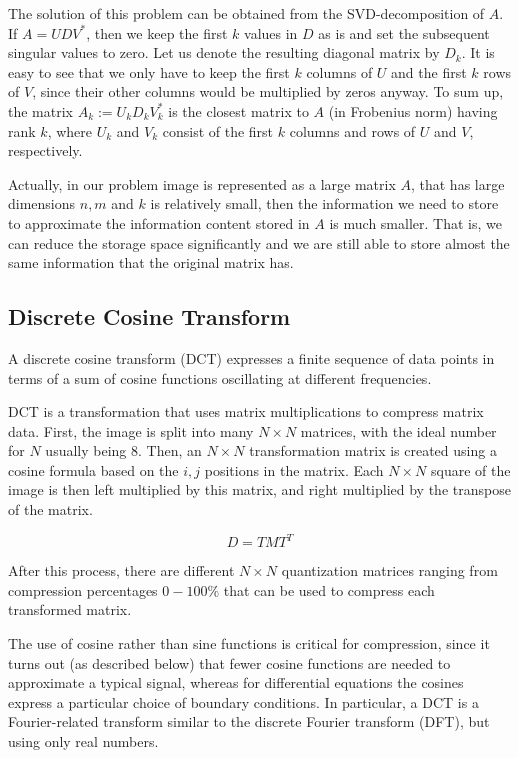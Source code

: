 The solution of this problem can be obtained from the SVD-decomposition of $A$. If $A = U D V^*$, then we keep the first $k$ values in $D$ as is and set the subsequent singular values to zero. Let us denote the resulting diagonal matrix by $D_k$. It is easy to see that we only have to keep the first $k$ columns of $U$ and the first $k$ rows of $V$, since their other columns would be multiplied by zeros anyway. To sum up, the matrix $A_k := U_k D_k V_k^*$ is the closest matrix to $A$ (in Frobenius norm) having rank $k$, where $U_k$ and $V_k$ consist of the first $k$ columns and rows of $U$ and $V$, respectively.

Actually, in our problem image is represented as a large matrix $A$, that has large dimensions $n,m$  and $k$ is relatively small, then the information we need to store to approximate the information content stored in $A$ is much smaller. That is, we can reduce the storage space significantly and we are still able to store almost the same information that the original matrix has.

\subsection{Discrete Cosine Transform}
A discrete cosine transform (DCT) expresses a finite sequence of data points in terms of a sum of cosine functions oscillating at different frequencies.

DCT is a transformation that uses matrix multiplications to compress matrix data. First, the image is split into many $N \times N$ matrices, with the ideal number for $N$ usually being $8$. Then, an $N \times N$ transformation matrix is created using a cosine formula based on the $i, j$ positions in the matrix. Each $N \times N$ square of the image is then left multiplied by this matrix, and right multiplied by the transpose of the matrix. 

$$D = TMT^T$$

After this process, there are different $N \times N$ quantization matrices ranging from compression percentages $0-100\%$ that can be used to compress each transformed matrix.

The use of cosine rather than sine functions is critical for compression, since it turns out (as described below) that fewer cosine functions are needed to approximate a typical signal, whereas for differential equations the cosines express a particular choice of boundary conditions. In particular, a DCT is a Fourier-related transform similar to the discrete Fourier transform (DFT), but using only real numbers.

